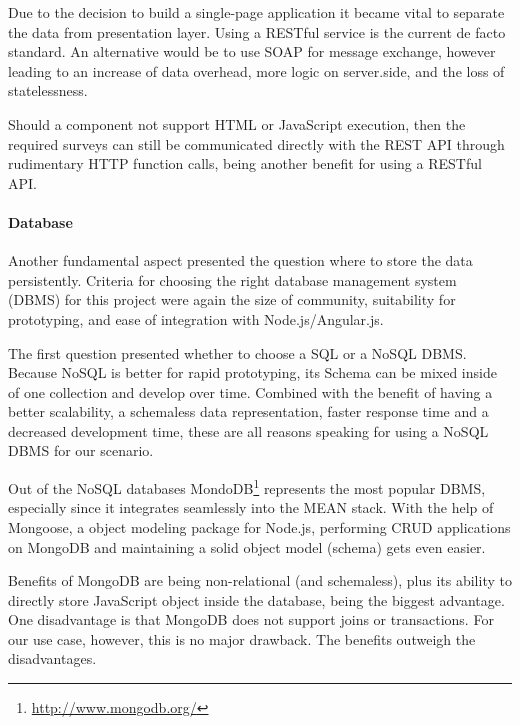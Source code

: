 
		Due to the decision to build a single-page application it became vital to separate the data from presentation layer. Using a RESTful service is the current de facto standard. An alternative would be to use SOAP for message exchange, however leading to an increase of data overhead, more logic on server.side, and the loss of statelessness.


		Should a component not support HTML or JavaScript execution, then the required surveys can still be communicated directly with the REST API through rudimentary HTTP function calls, being another benefit for using a RESTful API.






	\paragraph{Database}

		Another fundamental aspect presented the question where to store the data persistently. Criteria for choosing the right database management system (DBMS) for this project were again the size of community, suitability for prototyping, and ease of integration with Node.js/Angular.js.

		The first question presented whether to choose a SQL or a NoSQL DBMS. Because NoSQL is better for rapid prototyping, its Schema can be mixed inside of one collection and develop over time. Combined with the benefit of having a better scalability, a schemaless data representation, faster response time and a decreased development time\cite{vaish2013getting}, these are all reasons speaking for using a NoSQL DBMS for our scenario. 

		Out of the NoSQL databases MondoDB\footnote{\url{http://www.mongodb.org/}} represents the most popular DBMS, especially since it integrates seamlessly into the MEAN stack. With the help of Mongoose, a object modeling package for Node.js, performing CRUD applications on MongoDB and maintaining a solid object model (schema) gets even easier.

		Benefits of MongoDB are being non-relational (and schemaless), plus its ability to directly store JavaScript object inside the database, being the biggest advantage. One disadvantage is that MongoDB does not support joins or transactions. For our use case, however, this is no major drawback. The benefits outweigh the disadvantages.


